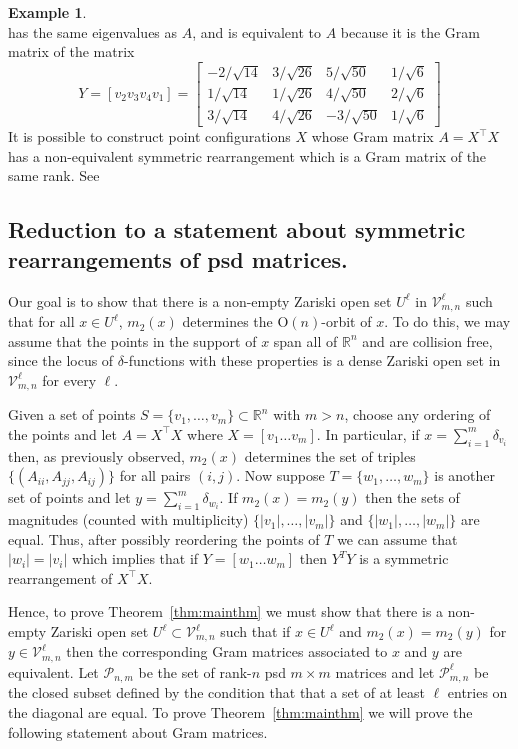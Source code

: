 \documentclass{article}
\theoremstyle{definition}
\newtheorem{Example}{Example}
\renewcommand{\r}{\mathbb{R}}
\renewcommand{\|}{|}
\newcommand{\V}{\mathcal{V}}
\renewcommand{\O}{\mathrm{O}}
\begin{document}
\begin{Example}
$$$$
has the same eigenvalues as $A$, and is equivalent to $A$ because it is the Gram matrix of the matrix $$Y = [v_2 v_3 v_4 v_1] = \begin{bmatrix}
    -2/\sqrt{14} & 3/\sqrt{26} & 5/\sqrt{50}  & 1/\sqrt{6}\\
     1/\sqrt{14} & 1/\sqrt{26} & 4/\sqrt{50}  & 2/\sqrt{6}\\
   3/\sqrt{14} & 4/\sqrt{26} & -3/\sqrt{50} & 1/\sqrt{6}
\end{bmatrix} 
$$
It is possible to construct point configurations $X$ whose Gram matrix $A= X^\top X$ has a non-equivalent symmetric rearrangement which is a Gram matrix of the same rank. See \cite[Example 5.5]{bendory2024beltway}
\end{Example}
\subsection{Reduction to a statement about symmetric rearrangements of psd matrices.}
Our goal is to show that there is a non-empty Zariski open set $U^\ell$ in $\V^{\ell}_{m,n}$ such that
for all $x \in U^\ell$, $m_2(x)$ determines the $\O(n)$-orbit of $x$.
To do this, we may assume that the points in the support of $x$ span all of $\r^n$ and are collision free,
since the locus of $\delta$-functions with these properties is a dense Zariski open set in $\V^\ell_{m,n}$ for every $\ell$.

Given a set of points $S =\{v_1, \ldots , v_m\} \subset \r^n$ with $m > n$, choose any ordering 
of the points and let $A = X^\top X$ where $X = [v_1 \ldots v_m]$. 
In particular, if $x = \sum_{i=1}^m \delta_{v_i}$
then, as previously observed, $m_2(x)$ determines the set of triples $\{(A_{ii}, A_{jj}, A_{ij})\}$ for
all pairs $(i,j)$. 
Now suppose $T = \{w_1, \ldots ,w_m\}$ is another set of points and let $y = \sum_{i=1}^m \delta_{w_i}$. If $m_2(x) = m_2(y)$ then the sets of magnitudes (counted with multiplicity) $\{|v_1|, \ldots , |v_m|\}$
and $\{ |w_1|, \ldots , |w_m|\}$ are equal. Thus, after possibly reordering the points of $T$ we can assume that $|w_i| = |v_i|$ 
which implies that if $Y= [w_1 \ldots w_m]$ then $Y^TY$ is a symmetric rearrangement of $X^\top X$.

Hence, to prove Theorem~\ref{thm:mainthm} we must show that there is a non-empty Zariski open set
$U^\ell \subset \V^\ell_{m,n}$ such that if $x \in U^\ell$ and 
$m_2(x) = m_2(y)$ for $y \in \V^{\ell}_{m,n}$ then 
the corresponding Gram matrices associated to $x$ and $y$ are equivalent.
Let $\mathcal{P}_{n,m}$ be the set of rank-$n$ psd $m \times m$ matrices
and let $\mathcal{P}^\ell_{m,n}$ be the closed subset defined by the condition that 
that a set of at least $\ell$ entries on the diagonal are equal. 
To prove Theorem~\ref{thm:mainthm} we will prove the following
statement about Gram matrices. 
\end{document}
